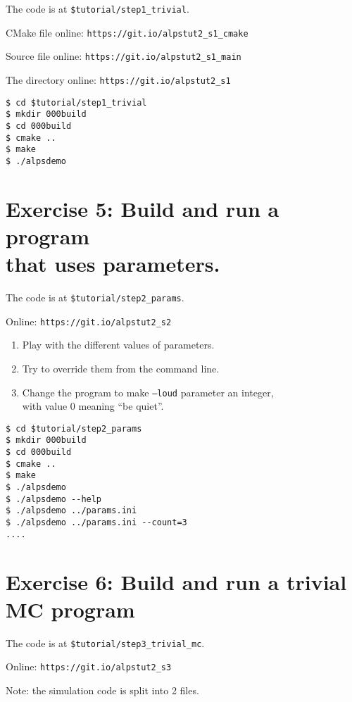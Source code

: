 \documentclass[12pt]{article}
\newcommand{\code}[1]{\texttt{#1}}
\begin{document}
The code is at \texttt{\color{ballblue}\$tutorial/step1\_trivial}.

CMake file online: \nolinkurl{https://git.io/alpstut2_s1_cmake}

Source file online: \nolinkurl{https://git.io/alpstut2_s1_main}

The directory online: \nolinkurl{https://git.io/alpstut2_s1}

\begin{lstlisting}[emph={cd,mkdir}]
$ cd $tutorial/step1_trivial
$ mkdir 000build
$ cd 000build
$ cmake ..
$ make
$ ./alpsdemo
\end{lstlisting}%

\section*{Exercise 5: Build and run a program\\ that uses parameters.}

The code is at \texttt{\color{ballblue}\$tutorial/step2\_params}.

Online: \nolinkurl{https://git.io/alpstut2_s2}

\begin{enumerate}
\item Play with the different values of parameters.
\item Try to override them from the command line.
\item Change the program to make \code{--loud} parameter an integer,\\
      with value 0 meaning ``be quiet''.
\end{enumerate}

\begin{lstlisting}[emph={cd,mkdir}]
$ cd $tutorial/step2_params
$ mkdir 000build
$ cd 000build
$ cmake ..
$ make
$ ./alpsdemo
$ ./alpsdemo --help
$ ./alpsdemo ../params.ini
$ ./alpsdemo ../params.ini --count=3
....
\end{lstlisting}

\section*{Exercise 6: Build and run a trivial MC program}

The code is at \texttt{\color{ballblue}\$tutorial/step3\_trivial\_mc}.

Online: \nolinkurl{https://git.io/alpstut2_s3}

Note: the simulation code is split into 2 files.
\end{document}
